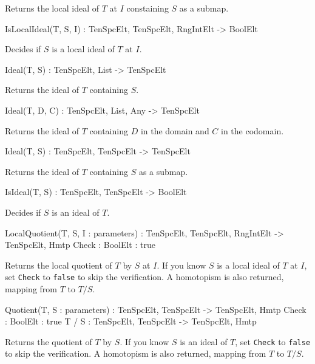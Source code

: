 Returns the local ideal of $T$ at $I$ constaining $S$ as a submap.


\begin{intrinsics}
IsLocalIdeal(T, S, I) : TenSpcElt, TenSpcElt, {RngIntElt} -> BoolElt
\end{intrinsics}

Decides if $S$ is a local ideal of $T$ at $I$.

\begin{intrinsics}
Ideal(T, S) : TenSpcElt, List -> TenSpcElt
\end{intrinsics}

Returns the ideal of $T$ containing $S$.

\begin{intrinsics}
Ideal(T, D, C) : TenSpcElt, List, Any -> TenSpcElt
\end{intrinsics}

Returns the ideal of $T$ containing $D$ in the domain and $C$ in the codomain.

\begin{intrinsics}
Ideal(T, S) : TenSpcElt, TenSpcElt -> TenSpcElt
\end{intrinsics}

Returns the ideal of $T$ containing $S$ as a submap.

\begin{intrinsics}
IsIdeal(T, S) : TenSpcElt, TenSpcElt -> BoolElt
\end{intrinsics}

Decides if $S$ is an ideal of $T$.

\begin{intrinsics}
LocalQuotient(T, S, I : parameters) : TenSpcElt, TenSpcElt, {RngIntElt} -> TenSpcElt, Hmtp
    Check : BoolElt : true
\end{intrinsics}

Returns the local quotient of $T$ by $S$ at $I$. If you know $S$ is a local 
ideal of $T$ at $I$, set {\tt Check} to {\tt false} to skip the verification.
A homotopism is also returned, mapping from $T$ to $T/S$.

\begin{intrinsics}
Quotient(T, S : parameters) : TenSpcElt, TenSpcElt -> TenSpcElt, Hmtp
    Check : BoolElt : true
T / S : TenSpcElt, TenSpcElt -> TenSpcElt, Hmtp
\end{intrinsics}

Returns the quotient of $T$ by $S$. If you know $S$ is an ideal of $T$, 
set {\tt Check} to {\tt false} to skip the verification.
A homotopism is also returned, mapping from $T$ to $T/S$.

